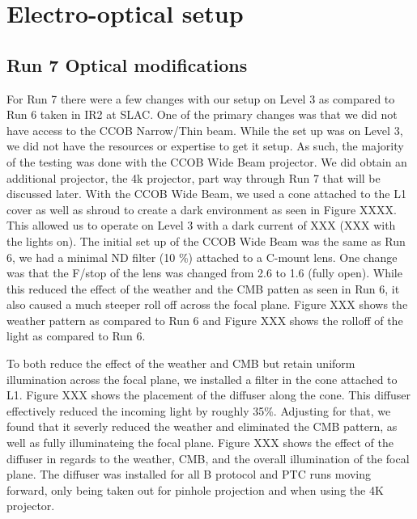 \section{Electro-optical setup}\label{electro-optical-setup}

\subsection{Run 7 Optical modifications}\label{run-7-optical-modifications}

For Run 7 there were a few changes with our setup on Level 3 as compared
to Run 6 taken in IR2 at SLAC. One of the primary changes was that we
did not have access to the CCOB Narrow/Thin beam. While the set up was
on Level 3, we did not have the resources or expertise to get it setup.
As such, the majority of the testing was done with the CCOB Wide Beam
projector. We did obtain an additional projector, the 4k projector, part
way through Run 7 that will be discussed later. With the CCOB Wide Beam,
we used a cone attached to the L1 cover as well as shroud to create a
dark environment as seen in Figure XXXX. This allowed us to operate on
Level 3 with a dark current of XXX (XXX with the lights on). The initial
set up of the CCOB Wide Beam was the same as Run 6, we had a minimal ND
filter (10 \%) attached to a C-mount lens. One change was that the
F/stop of the lens was changed from 2.6 to 1.6 (fully open). While this
reduced the effect of the \textquotesingle weather\textquotesingle{} and
the \textquotesingle CMB patten\textquotesingle{} as seen in Run 6, it
also caused a much steeper roll off across the focal plane. Figure XXX
shows the weather pattern as compared to Run 6 and Figure XXX shows the
rolloff of the light as compared to Run 6.

To both reduce the effect of the
\textquotesingle weather\textquotesingle{} and
\textquotesingle CMB\textquotesingle{} but retain uniform illumination
across the focal plane, we installed a filter in the cone attached to
L1. Figure XXX shows the placement of the diffuser along the cone. This
diffuser effectively reduced the incoming light by roughly 35\%.
Adjusting for that, we found that it severly reduced the
\textquotesingle weather\textquotesingle{} and eliminated the CMB
pattern, as well as fully illuminateing the focal plane. Figure XXX
shows the effect of the diffuser in regards to the weather, CMB, and the
overall illumination of the focal plane. The diffuser was installed for
all B protocol and PTC runs moving forward, only being taken out for
pinhole projection and when using the 4K projector.

